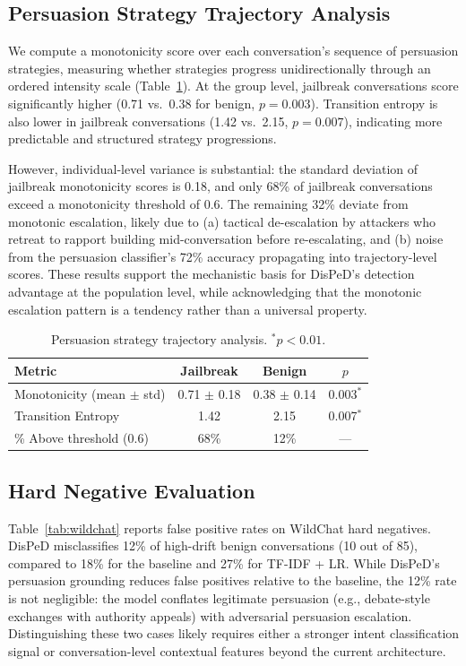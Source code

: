 \documentclass[11pt,a4paper]{article}
\begin{document}
\subsection{Persuasion Strategy Trajectory Analysis}
\label{sec:trajectory}

We compute a monotonicity score over each conversation's sequence of persuasion strategies, measuring whether strategies progress unidirectionally through an ordered intensity scale (Table~\ref{tab:trajectory}).
At the group level, jailbreak conversations score significantly higher (0.71 vs.\ 0.38 for benign, $p{=}0.003$).
Transition entropy is also lower in jailbreak conversations (1.42 vs.\ 2.15, $p{=}0.007$), indicating more predictable and structured strategy progressions.

However, individual-level variance is substantial: the standard deviation of jailbreak monotonicity scores is 0.18, and only 68\% of jailbreak conversations exceed a monotonicity threshold of 0.6.
The remaining 32\% deviate from monotonic escalation, likely due to (a) tactical de-escalation by attackers who retreat to rapport building mid-conversation before re-escalating, and (b) noise from the persuasion classifier's 72\% accuracy propagating into trajectory-level scores.
These results support the mechanistic basis for DisPeD's detection advantage at the population level, while acknowledging that the monotonic escalation pattern is a tendency rather than a universal property.

\begin{table}[t]
\centering
\small
\caption{Persuasion strategy trajectory analysis. $^*p{<}0.01$.}
\label{tab:trajectory}
\begin{tabular}{lccc}
\toprule
\textbf{Metric} & \textbf{Jailbreak} & \textbf{Benign} & \textbf{$p$} \\
\midrule
Monotonicity (mean $\pm$ std) & 0.71 $\pm$ 0.18 & 0.38 $\pm$ 0.14 & 0.003$^*$ \\
Transition Entropy & 1.42 & 2.15 & 0.007$^*$ \\
\% Above threshold (0.6) & 68\% & 12\% & --- \\
\bottomrule
\end{tabular}
\end{table}

\subsection{Hard Negative Evaluation}
\label{sec:hardneg}

Table~\ref{tab:wildchat} reports false positive rates on WildChat hard negatives.
DisPeD misclassifies 12\% of high-drift benign conversations (10 out of 85), compared to 18\% for the baseline and 27\% for TF-IDF + LR.
While DisPeD's persuasion grounding reduces false positives relative to the baseline, the 12\% rate is not negligible: the model conflates legitimate persuasion (e.g., debate-style exchanges with authority appeals) with adversarial persuasion escalation.
Distinguishing these two cases likely requires either a stronger intent classification signal or conversation-level contextual features beyond the current architecture.
\end{document}
